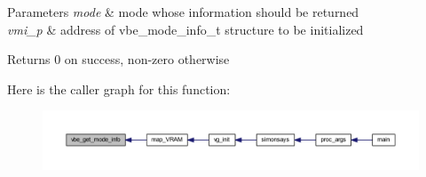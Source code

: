 \begin{DoxyParams}{Parameters}
{\em mode} & mode whose information should be returned \\
\hline
{\em vmi\+\_\+p} & address of vbe\+\_\+mode\+\_\+info\+\_\+t structure to be initialized \\
\hline
\end{DoxyParams}
\begin{DoxyReturn}{Returns}
0 on success, non-\/zero otherwise 
\end{DoxyReturn}
Here is the caller graph for this function\+:\nopagebreak
\begin{figure}[H]
\begin{center}
\leavevmode
\includegraphics[width=350pt]{group__vbe_ga4ef3234e41f2050bc094a22049b69e45_icgraph}
\end{center}
\end{figure}
